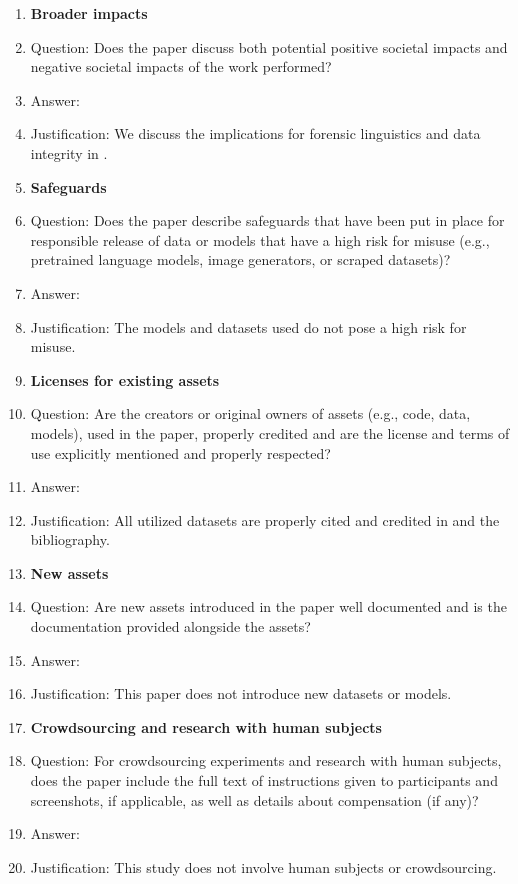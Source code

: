 \begin{enumerate}
\item {\bf Broader impacts}
    \item[] Question: Does the paper discuss both potential positive societal impacts and negative societal impacts of the work performed?
    \item[] Answer: \answerYes{}
    \item[] Justification: We discuss the implications for forensic linguistics and data integrity in .

\item {\bf Safeguards}
    \item[] Question: Does the paper describe safeguards that have been put in place for responsible release of data or models that have a high risk for misuse (e.g., pretrained language models, image generators, or scraped datasets)?
    \item[] Answer: \answerNA{}
    \item[] Justification: The models and datasets used do not pose a high risk for misuse.

\item {\bf Licenses for existing assets}
    \item[] Question: Are the creators or original owners of assets (e.g., code, data, models), used in the paper, properly credited and are the license and terms of use explicitly mentioned and properly respected?
    \item[] Answer: \answerYes{}
    \item[] Justification: All utilized datasets are properly cited and credited in  and the bibliography.

\item {\bf New assets}
    \item[] Question: Are new assets introduced in the paper well documented and is the documentation provided alongside the assets?
    \item[] Answer: \answerNA{}
    \item[] Justification: This paper does not introduce new datasets or models.

\item {\bf Crowdsourcing and research with human subjects}
    \item[] Question: For crowdsourcing experiments and research with human subjects, does the paper include the full text of instructions given to participants and screenshots, if applicable, as well as details about compensation (if any)? 
    \item[] Answer: \answerNA{}
    \item[] Justification: This study does not involve human subjects or crowdsourcing.


\end{enumerate}
